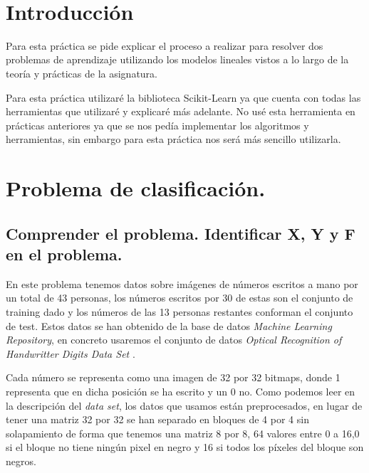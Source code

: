 \documentclass[12pt, spanish]{article}
\makeatletter
\let\thedate\@date
\makeatother
\begin{document}
\begin{titlepage}
    {\large \thedate}\\[0.5cm]
    {\doclicenseThis}
 	
    \vfill
    
\end{titlepage}


\tableofcontents
\pagebreak



\section*{Introducción}

Para esta práctica se pide explicar el proceso a realizar para resolver dos problemas de aprendizaje utilizando los modelos lineales vistos a lo largo de la teoría y prácticas de la asignatura.

Para esta práctica utilizaré la biblioteca Scikit-Learn\cite{sklearn} ya que cuenta con todas las herramientas que utilizaré y explicaré más adelante. No usé esta herramienta en prácticas anteriores ya que se nos pedía implementar los algoritmos y herramientas, sin embargo para esta práctica nos será más sencillo utilizarla.

\section{Problema de clasificación.}

\subsection{Comprender el problema. Identificar X, Y y F en el problema.}

En este problema tenemos datos sobre imágenes de números escritos a mano por un total de 43 personas, los números escritos por 30 de estas son el conjunto de training dado y los números de las 13 personas restantes conforman el conjunto de test. Estos datos se han obtenido de la base de datos \textit{Machine Learning Repository}, en concreto usaremos el conjunto de datos \textit{Optical Recognition of Handwritter Digits Data Set} \cite{mlr_digitos}.

Cada número se representa como una imagen de 32 por 32 bitmaps, donde 1 representa que en dicha posición se ha escrito y un 0 no. Como podemos leer en la descripción del \textit{data set}, los datos que usamos están preprocesados, en lugar de tener una matriz 32 por 32 se han separado en bloques de 4 por 4 sin solapamiento de forma que tenemos una matriz 8 por 8, 64 valores entre 0 a 16,0 si el bloque no tiene ningún pixel en negro y 16 si todos los píxeles del bloque son negros.
\end{document}
